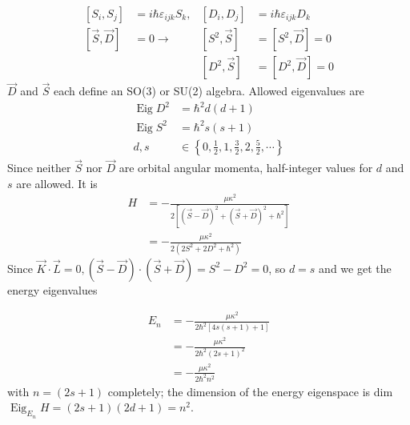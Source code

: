\begin{equation}
\begin{aligned}
    \left[S_{i}, S_{j}\right]&=i \hbar \varepsilon_{i j k} S_{k}, &\left[D_{i}, D_{j}\right] &=i \hbar \varepsilon_{i j k} D_{k} \\
    [\vec{S}, \vec{D}]&=0 \longrightarrow &\left[S^{2}, \vec{S}\right]&=\left[S^{2}, \vec{D}\right] =0 \\ 
    & &\left[D^{2}, \vec{S}\right] &=\left[D^{2}, \vec{D}\right]=0 \end{aligned}
\end{equation}
$\vec{D}$ and $\vec{S}$ each define an SO(3) or SU(2) algebra. Allowed eigenvalues ​​are
\begin{equation}
\begin{aligned} \operatorname{Eig} D^{2} &=\hbar^{2} d(d+1) \\ \operatorname{Eig} S^{2} &=\hbar^{2} s(s+1) \\ d, s & \in\left\{0, \frac{1}{2}, 1, \frac{3}{2}, 2, \frac{5}{2}, \cdots\right\} \end{aligned}
\end{equation}
Since neither $\vec{S}$ nor $\vec{D}$ are orbital angular momenta, half-integer values ​​for $d$ and $s$ are allowed. It is
\begin{equation}
\begin{aligned} H &=-\frac{\mu \kappa^{2}}{2\left[(\vec{S}-\vec{D})^{2}+(\vec{S}+\vec{D})^{2}+\hbar^{2}\right]} \\ &=-\frac{\mu \kappa^{2}}{2\left(2 S^{2}+2 D^{2}+\hbar^{2}\right)} \end{aligned}
\end{equation}
Since $\vec{K}\cdot\vec{L} = 0, (\vec{S} - \vec{D}) · (\vec{S} + \vec{D}) = S^2 - D^2 = 0$, so $d = s$ and we get the energy eigenvalues

\begin{equation}
\begin{aligned} E_{n} &=-\frac{\mu \kappa^{2}}{2 \hbar^{2}[4 s(s+1)+1]} \\ &=-\frac{\mu \kappa^{2}}{2 \hbar^{2}(2 s+1)^{2}} \\ &=-\frac{\mu \kappa^{2}}{2 \hbar^{2} n^{2}} \end{aligned}
\end{equation}
with $n = (2s + 1)$ completely; the dimension of the energy eigenspace is dim $\operatorname{Eig}_{E_n}H = (2s + 1) (2d + 1) = n^2$.